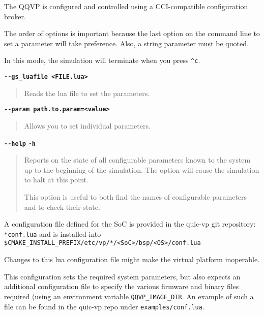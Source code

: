 The QQVP is configured and controlled using a CCI-compatible configuration broker.

The order of options is important because the last option on the command line to set a parameter will take preference. Also, a string parameter must be quoted.

\note In this mode, the simulation will terminate when you press {\small{\lstinline!^c!}}.

{\textbf {\footnotesize{\lstinline!--gs_luafile <FILE.lua>!}}}
\vspace{-2pt}
\begin{quote}
Reads the lua file to set the parameters.
\end{quote}

{\textbf {\footnotesize{\lstinline!--param path.to.param=<value>!}}}
\vspace{-2pt}
\begin{quote}
Allows you to set individual parameters.
\end{quote}

{\textbf {\footnotesize{\lstinline!--help!}}} \newline
{\textbf {\footnotesize{\lstinline!-h!}}}
\vspace{-2pt}
\begin{quote}
Reports on the state of all configurable parameters known to the system up to the beginning of the simulation. The option will cause the simulation to halt at this point.

This option is useful to both find the names of configurable parameters and to check their state.
\end{quote}



A configuration file defined for the SoC is provided in the quic-vp git
repository: {\small{\lstinline!*conf.lua!}} and is installed into
{\small{\lstinline!$CMAKE_INSTALL_PREFIX/etc/vp/*/<SoC>/bsp/<OS>/conf.lua!}}

\caution Changes to this lua configuration file might make the virtual platform inoperable.

This configuration sets the required system parameters,
but also expects an additional configuration file to specify the
various firmware and binary files required (using an environment variable
{\small{\lstinline!QQVP_IMAGE_DIR!}}.  An example of such a file can be found
in the quic-vp repo under {\small{\lstinline!examples/conf.lua!}}.

